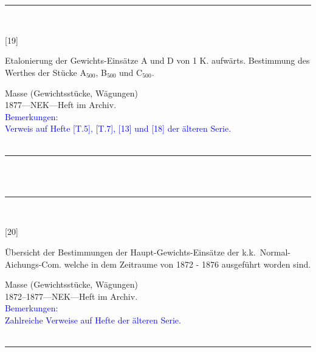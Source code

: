 \\
\vspace*{-2.5pt}\\
\parbox{\textwidth}{%
\rule{\textwidth}{1pt}\vspace*{-3mm}\\
\begin{minipage}[t]{0.15\textwidth}\vspace{0pt}
\Huge\rule[-4mm]{0cm}{1cm}[19]
\end{minipage}
\hfill
\begin{minipage}[t]{0.85\textwidth}\vspace{0pt}
\large Etalonierung der Gewichts-Einsätze A und D von 1 K. aufwärts. Bestimmung des Werthes der Stücke A$_\mathrm{500}$, B$_\mathrm{500}$ und C$_\mathrm{500}$.\rule[-2mm]{0mm}{2mm}
\end{minipage}
{\footnotesize\flushright
Masse (Gewichtsstücke, Wägungen)\\
}
1877\quad---\quad NEK\quad---\quad Heft im Archiv.\\
\textcolor{blue}{Bemerkungen:\\{}
Verweis auf Hefte [T.5], [T.7], [13] und [18] der älteren Serie.\\{}
}
\\[-15pt]
\rule{\textwidth}{1pt}
}
\\
\vspace*{-2.5pt}\\
\parbox{\textwidth}{%
\rule{\textwidth}{1pt}\vspace*{-3mm}\\
\begin{minipage}[t]{0.15\textwidth}\vspace{0pt}
\Huge\rule[-4mm]{0cm}{1cm}[20]
\end{minipage}
\hfill
\begin{minipage}[t]{0.85\textwidth}\vspace{0pt}
\large Übersicht der Bestimmungen der Haupt-Gewichts-Einsätze der k.k.\ Normal-Aichungs-Com. welche in dem Zeitraume von 1872 - 1876 ausgeführt worden sind.\rule[-2mm]{0mm}{2mm}
\end{minipage}
{\footnotesize\flushright
Masse (Gewichtsstücke, Wägungen)\\
}
1872--1877\quad---\quad NEK\quad---\quad Heft im Archiv.\\
\textcolor{blue}{Bemerkungen:\\{}
Zahlreiche Verweise auf Hefte der älteren Serie.\\{}
}
\\[-15pt]
\rule{\textwidth}{1pt}
}
